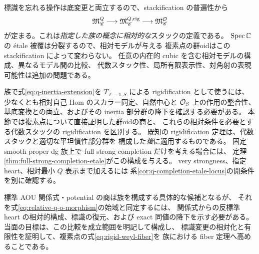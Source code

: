 標識を忘れる操作は底変更と両立するので、stackification の普遍性\cite[Tag 0436]{Stacks}から
\begin{equation}\label{eq:relative-q-o-morphism}
 \mathfrak M^Q_{\mathscr C}\longrightarrow
 \mathfrak M^{Q,\mathrm{rig}}_{\mathscr C}\longrightarrow
 \mathfrak M^{\mathcal O}_{\mathscr C}
\end{equation}
が定まる。これは\emph{指定した族の概念に相対的な}スタックの定義である。
$\operatorname{Spec}\mathbb C$ の \'etale 被覆は分裂するので、相対モデルが与える
複素点の群oidはこの stackification によって変わらない。
任意の内在的 cubic を含む相対モデルの構成、異なるモデル間の比較、
代数スタック性、局所有限表示性、対角射の表現可能性は追加の問題である。

族で式\eqref{eq:q-inertia-extension}を $T_{\ell-1,S}$ による rigidification として使うには、
少なくとも相対自己 Hom のスカラー同定、自然中心と $\mathcal O_S$ 上の作用の整合性、
基底変換との両立、およびその inertia 部分群の降下を確認する必要がある。
本節では複素点について直接証明した群oidの商と、
これらの相対条件を必要とする代数スタックの rigidification を区別する。
既知の rigidification 定理\cite[Tag 04V2]{Stacks}は、代数スタックと適切な平坦慣性部分群を
構成した\emph{後}に適用するものである。
固定 smooth proper dg 族上で full strong completion だけを考える場合には、
定理\ref{thm:full-strong-completion-etale}がこの構成を与える。
very strongness、指定 heart、相対最小 $Q$ 表示まで加えるには
系\ref{cor:q-completion-etale-locus}の開条件を別に確認する。

標準 AOU 関係式・potential の商は族を構成する具体的な候補となるが、
それを式\eqref{eq:relative-q-o-morphism}の始域と同定するには、
関係式からの反標準 heart の相対的構成、標識の復元、および exact 同値の降下を示す必要がある。
当面の目標は、この比較を成立範囲を明記して構成し、
標識変更の相対化と有限性を証明して、複素点の式\eqref{eq:rigid-weyl-fiber}を
族における fiber 定理へ高めることである。
